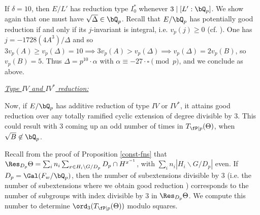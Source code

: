 If $\delta = 10$, then $E / L'$ has reduction type $I_0^*$ whenever $3 \mid [ L' : \bQ_p]$. 
We show again that one must have $\sqrt{\Delta} \in \bQ_p$. Recall that $E / \bQ_p$ has potentially good reduction if and only if its $j$-invariant is integral, i.e. $v_p(j) \geq 0$ (cf. \cite[\S VII.5, Proposition 5.5]{S1}). One has $j = -1728(4A^3) / \Delta$ and so $3 v_p(A) \geq v_p(\Delta) = 10 \implies 3 v_p(A) > v_p(\Delta) \implies v_p(\Delta) = 2v_p(B)$, so $v_p(B) = 5$. Thus $\Delta = p^{10} \cdot \alpha$ with $\alpha \equiv -27 \cdot \square \pmod p$, and we conclude as above.    

\vspace{1em}

\noindent\underline{\textit{Type $IV$ and $IV^*$ reduction:}}

Now, if $E /\bQ_p$ has additive reduction of type $IV$ or $IV^*$, it attains good reduction over any totally ramified cyclic extension of degree divisible by $3$. This could result with $3$ coming up an odd number of times in $T_{\fP \mid p}(\Theta)$, when $\sqrt{B} \not\in \bQ_p$. 


Recall from the proof of Proposition \ref{const-fns} that $\Res_{D_p} \Theta = \sum_i n_i \sum_{x \in H_i \backslash G / D_p} D_p \cap H^{x^{-1}}$, with $\sum_i n_i | H_i \backslash G / D_p|$ even. If $D_p = \Gal(F_w / \bQ_p)$, then the number of subextensions divisible by $3$ (i.e. the number of subextensions where we obtain good reduction ) corresponds to the number of subgroups with index divisible by $3$ in $\Res_{D_p}\Theta$. We compute this number to determine $\ord_3(T_{\fP \mid p}(\Theta))$ modulo squares.

